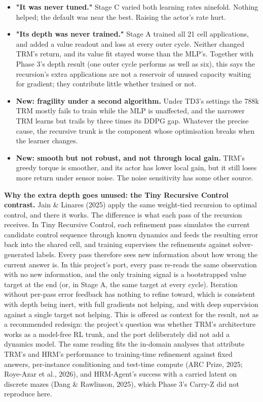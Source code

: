 \documentclass[11pt]{article}
\begin{document}
\begin{itemize}
\item \textbf{"It was never tuned."} Stage C varied both learning rates ninefold. Nothing helped; the default was near the best. Raising the actor's rate hurt.
\item \textbf{"Its depth was never trained."} Stage A trained all 21 cell applications, and added a value readout and loss at every outer cycle. Neither changed TRM's return, and its value fit stayed worse than the MLP's. Together with Phase 3's depth result (one outer cycle performs as well as six), this says the recursion's extra applications are not a reservoir of unused capacity waiting for gradient; they contribute little whether trained or not.
\item \textbf{New: fragility under a second algorithm.} Under TD3's settings the 788k TRM mostly fails to train while the MLP is unaffected, and the narrower TRM learns but trails by three times its DDPG gap. Whatever the precise cause, the recursive trunk is the component whose optimisation breaks when the learner changes.
\item \textbf{New: smooth but not robust, and not through local gain.} TRM's greedy torque is smoother, and its actor has lower local gain, but it still loses more return under sensor noise. The noise sensitivity has some other source.
\end{itemize}



\textbf{Why the extra depth goes unused: the Tiny Recursive Control contrast.} Jain \& Linares (2025) apply the same weight-tied recursion to optimal control, and there it works. The difference is what each pass of the recursion receives. In Tiny Recursive Control, each refinement pass simulates the current candidate control sequence through known dynamics and feeds the resulting error back into the shared cell, and training supervises the refinements against solver-generated labels. Every pass therefore sees new information about how wrong the current answer is. In this project's port, every pass re-reads the same observation with no new information, and the only training signal is a bootstrapped value target at the end (or, in Stage A, the same target at every cycle). Iteration without per-pass error feedback has nothing to refine toward, which is consistent with depth being inert, with full gradients not helping, and with deep supervision against a single target not helping. This is offered as context for the result, not as a recommended redesign: the project's question was whether TRM's architecture works as a model-free RL trunk, and the port deliberately did not add a dynamics model. The same reading fits the in-domain analyses that attribute TRM's and HRM's performance to training-time refinement against fixed answers, per-instance conditioning and test-time compute (ARC Prize, 2025; Roye-Azar et al., 2026), and HRM-Agent's success with a carried latent on discrete mazes (Dang \& Rawlinson, 2025), which Phase 3's Carry-Z did not reproduce here.
\end{document}
